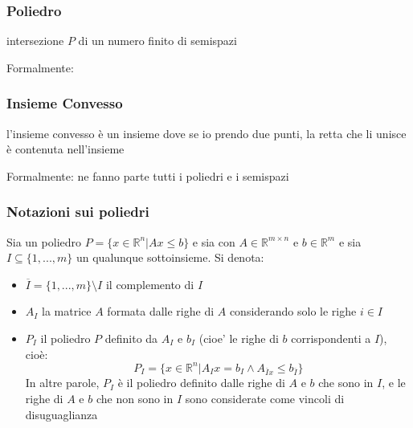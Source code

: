   \subsubsection{Poliedro}
  intersezione $P$ di un numero finito di semispazi
  
  Formalmente:

  \subsubsection{Insieme Convesso}
  l'insieme convesso è un insieme dove se io prendo due punti, la retta che li unisce è contenuta nell'insieme
  
  Formalmente:
  ne fanno parte tutti i poliedri e i semispazi

\subsubsection{Notazioni sui poliedri}
Sia un poliedro $ P = \{x \in \mathbb{R}^{n} | Ax \leq b\} $ e sia con $A\in\mathbb{R}^{m \times n}$ e $b\in\mathbb{R}^{m}$ e sia $I\subseteq \{1,...,m\} $ un qualunque sottoinsieme. Si denota:
\begin{itemize}
  \item $\overline{I} = \{1,...,m\} \setminus I$ il complemento di $I$
  \item $A_I$ la matrice $A$ formata dalle righe di $A$ considerando solo le righe $i\in I$
  \item $P_I$ il poliedro $P$ definito da $A_I$ e $b_I$ (cioe' le righe di $b$ corrispondenti a $I$), cioè:
  \[
    P_I = \{x \in \mathbb{R}^{n} | A_I x  = b_I \land A_{\overline{I}x}\leq b_{\overline{I}}\}
  \]
  In altre parole, $P_I$ è il poliedro definito dalle righe di $A$ e $b$ che sono in $I$, e le righe di $A$ e $b$ che non sono in $I$ sono considerate come vincoli di disuguaglianza
\end{itemize}

